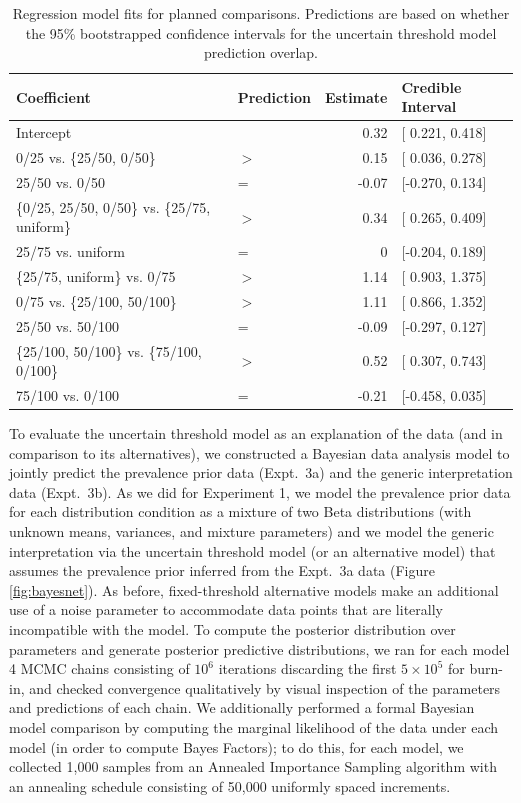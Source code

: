 \documentclass[floatsintext,doc]{apa6}
\begin{document}
\begin{table}[h]
\centering
\begingroup\fontsize{10pt}{11pt}\selectfont
\begin{tabular}{llrl}
  \hline
Coefficient & Prediction & Estimate & Credible Interval \\ 
  \hline
Intercept &  & 0.32 & [ 0.221, 0.418] \\ 
  0/25 vs. \{25/50, 0/50\} & $>$ & 0.15 & [ 0.036, 0.278] \\ 
  25/50 vs. 0/50 & = & -0.07 & [-0.270, 0.134] \\ 
  \{0/25, 25/50, 0/50\} vs. \{25/75, uniform\} & $>$ & 0.34 & [ 0.265, 0.409] \\ 
  25/75 vs. uniform & = & 0 & [-0.204, 0.189] \\ 
  \{25/75, uniform\} vs. 0/75 & $>$ & 1.14 & [ 0.903, 1.375] \\ 
  0/75 vs. \{25/100, 50/100\} & $>$ & 1.11 & [ 0.866, 1.352] \\ 
  25/50 vs. 50/100 & = & -0.09 & [-0.297, 0.127] \\ 
  \{25/100, 50/100\} vs. \{75/100, 0/100\} & $>$ & 0.52 & [ 0.307, 0.743] \\ 
  75/100 vs. 0/100 & = & -0.21 & [-0.458, 0.035] \\ 
   \hline
\end{tabular}
\endgroup
\caption{Regression model fits for planned comparisons. Predictions are based on whether the 95\% bootstrapped confidence intervals for the uncertain threshold model prediction overlap.} 
\label{tab:regResults}
\end{table}

To evaluate the uncertain threshold model as an explanation of the data (and in comparison to its alternatives), we constructed a Bayesian data analysis model to jointly predict the prevalence prior data (Expt.~3a) and the generic interpretation data (Expt.~3b).
As we did for Experiment 1, we model the prevalence prior data for each distribution condition as a mixture of two Beta distributions (with unknown means, variances, and mixture parameters) and we model the generic interpretation via the uncertain threshold model (or an alternative model) that assumes the prevalence prior inferred from the Expt.~3a data (Figure \ref{fig:bayesnet}).
As before, fixed-threshold alternative models make an additional use of a noise parameter to accommodate data points that are literally incompatible with the model. 
To compute the posterior distribution over parameters and generate posterior predictive distributions, we ran for each model 4 MCMC chains consisting of $10^6$ iterations discarding the first $5 \times 10^5$ for burn-in, and checked convergence qualitatively by visual inspection of the parameters and predictions of each chain. 
We additionally performed a formal Bayesian model comparison by computing the marginal likelihood of the data under each model (in order to compute Bayes Factors); to do this, for each model, we collected 1,000 samples from an Annealed Importance Sampling algorithm with an annealing schedule consisting of 50,000 uniformly spaced increments. 
\end{document}
